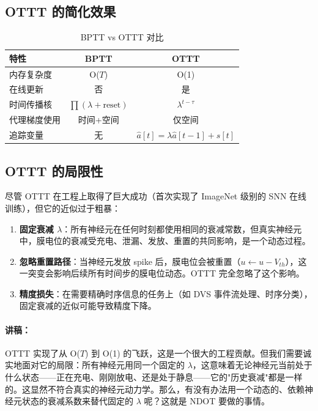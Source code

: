 \documentclass[journal,12pt,onecolumn]{IEEEtran}
\begin{document}
\subsection*{OTTT 的简化效果}

\begin{table}[h]
\centering
\caption{BPTT vs OTTT 对比}
\begin{tabular}{lcc}
\toprule
\textbf{特性} & \textbf{BPTT} & \textbf{OTTT} \\
\midrule
内存复杂度 & O($T$) & O(1) \\
在线更新     & 否   & 是 \\
时间传播核   & $\prod(\lambda + \text{reset})$ & $\lambda^{t-\tau}$ \\
代理梯度使用 & 时间+空间 & 仅空间 \\
追踪变量     & 无   & $\hat{a}[t] = \lambda\hat{a}[t-1] + s[t]$ \\
\bottomrule
\end{tabular}
\label{tab.bptt_ottt}
\end{table}

\subsection*{OTTT 的局限性}

尽管 OTTT 在工程上取得了巨大成功（首次实现了 ImageNet 级别的 SNN 在线训练），但它的近似过于粗暴：

\begin{enumerate}
    \item \textbf{固定衰减 $\lambda$}：所有神经元在任何时刻都使用相同的衰减常数，但真实神经元中，膜电位的衰减受充电、泄漏、发放、重置的共同影响，是一个动态过程。
    \item \textbf{忽略重置路径}：当神经元发放 spike 后，膜电位会被重置（$u \leftarrow u - V_{th}$），这一突变会影响后续所有时间步的膜电位动态。OTTT 完全忽略了这个影响。
    \item \textbf{精度损失}：在需要精确时序信息的任务上（如 DVS 事件流处理、时序分类），固定衰减的近似可能导致精度下降。
\end{enumerate}

\paragraph{讲稿：}
OTTT 实现了从 O($T$) 到 O(1) 的飞跃，这是一个很大的工程贡献。但我们需要诚实地面对它的局限：所有神经元用同一个固定的 $\lambda$，这意味着无论神经元当前处于什么状态——正在充电、刚刚放电、还是处于静息——它的"历史衰减"都是一样的。这显然不符合真实的神经元动力学。那么，有没有办法用一个动态的、依赖神经元状态的衰减系数来替代固定的 $\lambda$ 呢？这就是 NDOT 要做的事情。
\end{document}
